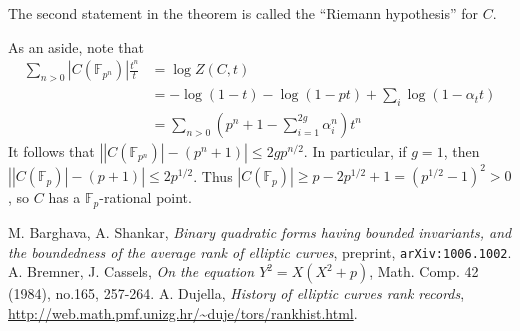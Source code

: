 \documentclass{article}
\theoremstyle{definition}
\begin{document}
The second statement in the theorem is called the ``Riemann hypothesis'' for 
$C$. 

As an aside, note that 
\begin{align*}
  \sum_{n>0} |C(\mathbb{F}_{p^n})| \frac{t^n}{t} 
    &= \log Z(C,t) \\
    &= -\log(1-t) - \log(1-p t) + \sum_i \log(1-\alpha_t t) \\
    &= \sum_{n>0} \left(p^n+1-\sum_{i=1}^{2 g} \alpha_i^n\right) t^n
\end{align*}
It follows that 
$\left||C(\mathbb{F}_{p^n})|-(p^n+1)\right| \leqslant 2 g p^{n/2}$. In 
particular, if $g=1$, then 
$\left| |C(\mathbb{F}_p)|-(p+1)\right| \leqslant 2 p^{1/2}$. Thus 
$|C(\mathbb{F}_p)| \geqslant p-2 p^{1/2}+1 = (p^{1/2}-1)^2>0$, so 
$C$ has a $\mathbb{F}_p$-rational point. 











\begin{thebibliography}{9}
   M. Barghava, A. Shankar, \emph{Binary quadratic forms having bounded invariants, and the boundedness of the average rank of elliptic curves}, preprint, \texttt{arXiv:1006.1002}.
   A. Bremner, J. Cassels, \emph{On the equation $Y^2=X(X^2+p)$}, Math. Comp. 42 (1984), no.165, 257-264. 
   A. Dujella, \emph{History of elliptic curves rank records}, \url{http://web.math.pmf.unizg.hr/~duje/tors/rankhist.html}. 
\end{thebibliography}
\end{document}

